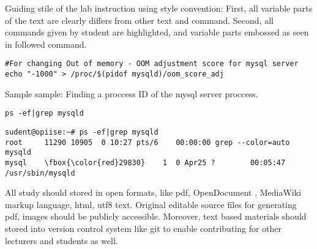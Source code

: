 Guiding stile of the lab instruction using style convention: First, all variable parts of the text are clearly differs from other text and command. Second, all commands given by student are highlighted, and variable parts embossed as seen in followed command.


\begin{verbatim}
#For changing Out of memory - OOM adjustment score for mysql server
echo "-1000" > /proc/$(pidof mysqld)/oom_score_adj
\end{verbatim}



Sample sample: Finding a proccess ID of the mysql server proccess.

\begin{verbatim}
ps -ef|grep mysqld
\end{verbatim}
\label{code_sample}
%
\small{
\begin{Verbatim}[frame=single,
label=Command output,framesep=2mm,rulecolor=\color{red},commandchars=\\\{\}]
sudent@opiise:~# ps -ef|grep mysqld
root     11290 10905  0 10:27 pts/6    00:00:00 grep --color=auto mysqld
mysql    \fbox{\color{red}29830}    1  0 Apr25 ?        00:05:47 /usr/sbin/mysqld
\end{Verbatim}
%
}

All study should stored in open formats, like pdf, OpenDocument , MediaWiki markup language, html, utf8 text. Original editable source files for generating pdf, images should be publicly accessible. Moreover, text based materials should stored into version control system like \gls{git} to enable contributing for other lecturers and students as well.



